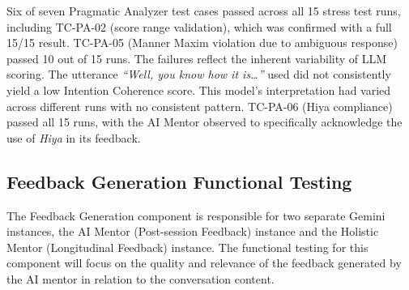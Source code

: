 \noindent Six of seven Pragmatic Analyzer test cases passed across all 15 stress test runs, including TC-PA-02 (score range validation), which was confirmed with a full 15/15 result. TC-PA-05 (Manner Maxim violation due to ambiguous response) passed 10 out of 15 runs. The failures reflect the 
inherent variability of LLM scoring. The utterance \textit{``Well, you know how it is\ldots''} used did not consistently yield a low Intention Coherence score. This model's interpretation had varied across different runs with no consistent pattern. 
TC-PA-06 (Hiya compliance) passed all 15 runs, with the AI Mentor observed to specifically acknowledge the use of \textit{Hiya} in its feedback.
 
\subsection{Feedback Generation Functional Testing}
 
  The Feedback Generation component is responsible for two separate Gemini instances, the AI Mentor (Post-session Feedback) instance and the Holistic Mentor (Longitudinal Feedback) instance. The functional testing for this component will focus on the quality and relevance of
the feedback generated by the AI mentor in relation to the conversation content.
 
